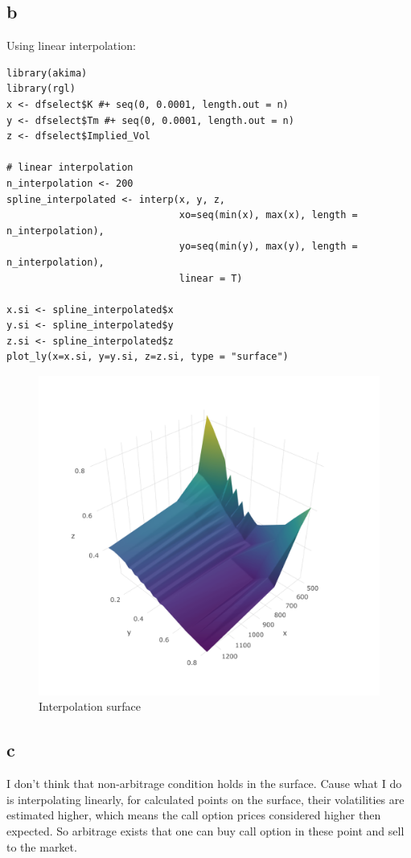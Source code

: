 \documentclass{article}
\begin{document}
\subsection{b}

Using linear interpolation:
\begin{verbatim}
library(akima)
library(rgl)
x <- dfselect$K #+ seq(0, 0.0001, length.out = n)
y <- dfselect$Tm #+ seq(0, 0.0001, length.out = n)
z <- dfselect$Implied_Vol

# linear interpolation
n_interpolation <- 200
spline_interpolated <- interp(x, y, z,
                              xo=seq(min(x), max(x), length = n_interpolation),
                              yo=seq(min(y), max(y), length = n_interpolation),
                              linear = T)

x.si <- spline_interpolated$x
y.si <- spline_interpolated$y
z.si <- spline_interpolated$z
plot_ly(x=x.si, y=y.si, z=z.si, type = "surface")
\end{verbatim}

\begin{figure}[h] 
\begin{center} 
\includegraphics[width = 13cm]{int.png}  
\caption{Interpolation surface} 
\end{center} 
\end{figure}

\subsection{c}
I don't think that non-arbitrage condition holds in the surface. Cause what I do is interpolating linearly, for calculated points on the surface, their volatilities are estimated higher, which means the call option prices considered higher then expected. So arbitrage exists that one can buy call option in these point and sell to the market.
\end{document}
